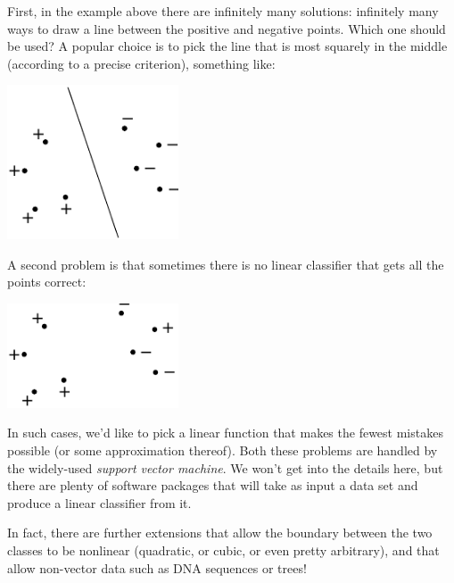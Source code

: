 First, in the example above there are infinitely many solutions: infinitely many
ways to draw a line between the positive and negative points. Which one should be
used? A popular choice is to pick the line that is most squarely in the middle
(according to a precise criterion), something like:

\begin{center}
\includegraphics[width=2in]{figs/linear3.pdf}
\end{center}

A second problem is that sometimes there is no linear classifier that gets all
the points correct:

\begin{center}
\includegraphics[width=2in]{figs/linear4.pdf}
\end{center}

\noindent
In such cases, we'd like to pick a linear function that makes the fewest mistakes 
possible (or some approximation thereof). Both these problems are handled by the
widely-used {\it support vector machine}. We won't get into the details here, but
there are plenty of software packages that will take as input a data set and 
produce a linear classifier from it.

In fact, there are further extensions that allow the boundary between the two 
classes to be nonlinear (quadratic, or cubic, or even pretty arbitrary), and 
that allow non-vector data such as DNA sequences or trees!



